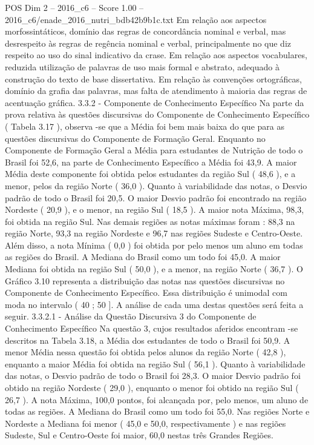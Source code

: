 \begin{textsample}{POS Dim 2 – 2016\_c6 – Score 1.00 – 2016\_c6/enade\_2016\_nutri\_bdb42b9b1c.txt}
Em relação aos aspectos morfossintáticos, domínio das regras de concordância nominal e verbal, mas desrespeito às regras de regência nominal e verbal, principalmente no que diz respeito ao uso do sinal indicativo da crase.
Em relação aos aspectos vocabulares, reduzida utilização de palavras de uso mais formal e abstrato, adequado à construção do texto de base dissertativa.
Em relação às convenções ortográficas, domínio da grafia das palavras, mas falta de atendimento à maioria das regras de acentuação gráfica. 3.3.2 - Componente de Conhecimento Específico Na parte da prova relativa às questões discursivas do Componente de Conhecimento Específico ( Tabela 3.17 ), observa -se que a Média foi bem mais baixa do que para as questões discursivas do Componente de Formação Geral.
Enquanto no Componente de Formação Geral a Média para estudantes de Nutrição de todo o Brasil foi 52,6, na parte de Conhecimento Específico a Média foi 43,9.
A maior Média deste componente foi obtida pelos estudantes da região Sul ( 48,6 ), e a menor, pelos da região Norte ( 36,0 ).
Quanto à variabilidade das notas, o Desvio padrão de todo o Brasil foi 20,5.
O maior Desvio padrão foi encontrado na região Nordeste ( 20,9 ), e o menor, na região Sul ( 18,5 ).
A maior nota Máxima, 98,3, foi obtida na região Sul.
Nas demais regiões as notas máximas foram : 88,3 na região Norte, 93,3 na região Nordeste e 96,7 nas regiões Sudeste e Centro-Oeste.
Além disso, a nota Mínima ( 0,0 ) foi obtida por pelo menos um aluno em todas as regiões do Brasil.
A Mediana do Brasil como um todo foi 45,0.
A maior Mediana foi obtida na região Sul ( 50,0 ), e a menor, na região Norte ( 36,7 ).
O Gráfico 3.10 representa a distribuição das notas nas questões discursivas no Componente de Conhecimento Específico.
Essa distribuição é unimodal com moda no intervalo ( 40 ; 50 ].
A análise de cada uma destas questões será feita a seguir. 3.3.2.1 - Análise da Questão Discursiva 3 do Componente de Conhecimento Específico Na questão 3, cujos resultados aferidos encontram -se descritos na Tabela 3.18, a Média dos estudantes de todo o Brasil foi 50,9.
A menor Média nessa questão foi obtida pelos alunos da região Norte ( 42,8 ), enquanto a maior Média foi obtida na região Sul ( 56,1 ).
Quanto à variabilidade das notas, o Desvio padrão de todo o Brasil foi 28,3.
O maior Desvio padrão foi obtido na região Nordeste ( 29,0 ), enquanto o menor foi obtido na região Sul ( 26,7 ).
A nota Máxima, 100,0 pontos, foi alcançada por, pelo menos, um aluno de todas as regiões.
A Mediana do Brasil como um todo foi 55,0.
Nas regiões Norte e Nordeste a Mediana foi menor ( 45,0 e 50,0, respectivamente ) e nas regiões Sudeste, Sul e Centro-Oeste foi maior, 60,0 nestas três Grandes Regiões.

\end{textsample}
